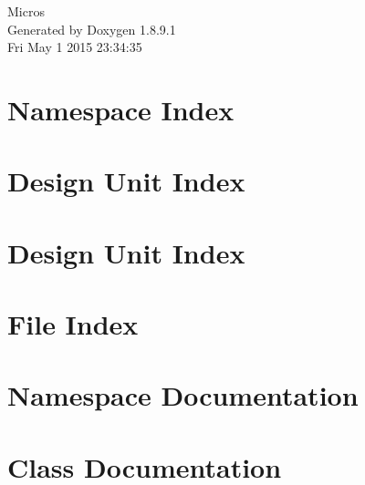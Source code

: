 \documentclass[twoside]{book}
\newcommand{\+}{\discretionary{\mbox{\scriptsize$\hookleftarrow$}}{}{}}
\newcommand{\clearemptydoublepage}{%
  \newpage{\pagestyle{empty}\cleardoublepage}%
}
\begin{document}
\hypersetup{pageanchor=false,
             bookmarks=true,
             bookmarksnumbered=true,
             pdfencoding=unicode
            }
\begin{titlepage}
\vspace*{7cm}
\begin{center}%
{\Large Micros }\\
\vspace*{1cm}
{\large Generated by Doxygen 1.8.9.1}\\
\vspace*{0.5cm}
{\small Fri May 1 2015 23:34:35}\\
\end{center}
\end{titlepage}
\clearemptydoublepage
\tableofcontents
\clearemptydoublepage
{}
\hypersetup{pageanchor=true}

\chapter{Namespace Index}

\chapter{Design Unit Index}

\chapter{Design Unit Index}

\chapter{File Index}

\chapter{Namespace Documentation}


\chapter{Class Documentation}



























\end{document}
